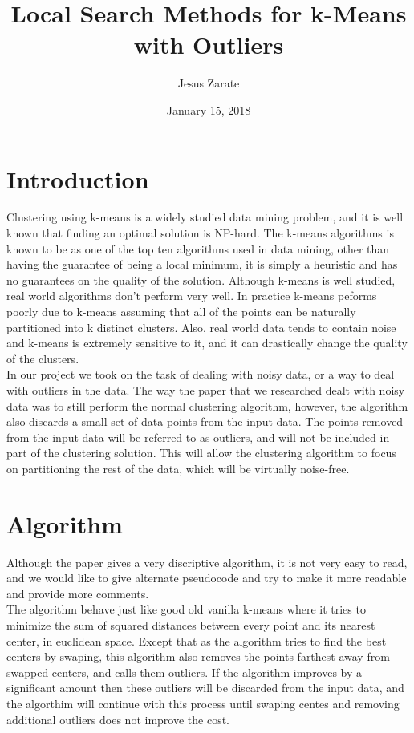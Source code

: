 \documentclass[11pt]{article}
\title{Local Search Methods for k-Means with Outliers}
\author{Jesus Zarate}
\date{January 15, 2018}
\begin{document}
\maketitle

\section{Introduction}

Clustering using k-means is a widely studied data mining problem, and it is well known that
finding an optimal solution is NP-hard. The k-means algorithms is known to be as one of the top
ten algorithms used in data mining, other than having the guarantee of being a local
minimum, it is simply a heuristic and has no guarantees on the quality of the solution.
Although k-means is well studied, real world algorithms don't perform very well. In
practice k-means peforms poorly due to k-means assuming that all of the points can be
naturally partitioned into k distinct clusters. Also, real world data tends to contain
noise and k-means is extremely sensitive to it, and it can drastically change the
quality of the clusters.\\

In our project we took on the task of dealing with noisy data, or a way to deal with
outliers in the data. The way the paper that we researched dealt with noisy data was
to still perform the normal clustering algorithm, however, the algorithm also discards
a small set of data points from the input data. The points removed from the input
data will be referred to as outliers, and will not be included in part of the clustering
solution. This will allow the clustering algorithm to focus on partitioning the rest
of the data, which will be virtually noise-free.




\section{Algorithm}
Although the paper gives a very discriptive algorithm, it is not very easy to read, and
we would like to give alternate pseudocode and try to make it more readable and provide
more comments.\\

The algorithm behave just like good old vanilla k-means where it tries to minimize
the sum of squared distances between every point and its nearest center, in euclidean
space. Except that as the algorithm tries to find the best centers by swaping, this
algorithm also removes the points farthest away from swapped centers, and calls them
outliers. If the algorithm improves by a significant amount then these outliers
will be discarded from the input data, and the algorthim will continue with this
process until swaping centes and removing additional outliers does not improve
the cost. \\
\end{document}
